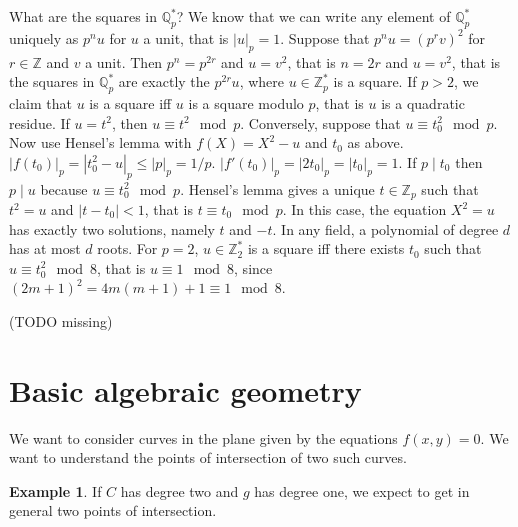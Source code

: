 \documentclass{article}
\newcommand{\Z}{\mathbb{Z}}
\newcommand{\Q}{\mathbb{Q}}
\newcommand{\rb}[1]{\left( #1 \right)}
\newcommand{\abs}[1]{\left\lvert #1 \right\rvert}
\theoremstyle{definition}\newtheorem{definition}{Definition}[section]
\theoremstyle{definition}\newtheorem{remark}[definition]{Remark}
\theoremstyle{definition}\newtheorem*{example}{Example}
\theoremstyle{definition}\newtheorem*{note}{Note}
\begin{document}

What are the squares in $ \Q_p^* $? We know that we can write any element of $ \Q_p^* $ uniquely as $ p^nu $ for $ u $ a unit, that is $ \abs{u}_p = 1 $. Suppose that $ p^nu = \rb{p^rv}^2 $ for $ r \in \Z $ and $ v $ a unit. Then $ p^n = p^{2r} $ and $ u = v^2 $, that is $ n = 2r $ and $ u = v^2 $, that is the squares in $ \Q_p^* $ are exactly the $ p^{2r}u $, where $ u \in \Z_p^* $ is a square. If $ p > 2 $, we claim that $ u $ is a square iff $ u $ is a square modulo $ p $, that is $ u $ is a quadratic residue. If $ u = t^2 $, then $ u \equiv t^2 \mod p $. Conversely, suppose that $ u \equiv t_0^2 \mod p $. Now use Hensel's lemma with $ f\rb{X} = X^2 - u $ and $ t_0 $ as above. $ \abs{f\rb{t_0}}_p = \abs{t_0^2 - u}_p \le \abs{p}_p = 1 / p $. $ \abs{f'\rb{t_0}}_p = \abs{2t_0}_p = \abs{t_0}_p = 1 $. If $ p \mid t_0 $ then $ p \mid u $ because $ u \equiv t_0^2 \mod p $. Hensel's lemma gives a unique $ t \in \Z_p $ such that $ t^2 = u $ and $ \abs{t - t_0} < 1 $, that is $ t \equiv t_0 \mod p $. In this case, the equation $ X^2 = u $ has exactly two solutions, namely $ t $ and $ -t $. In any field, a polynomial of degree $ d $ has at most $ d $ roots. For $ p = 2 $, $ u \in \Z_2^* $ is a square iff there exists $ t_0 $ such that $ u \equiv t_0^2 \mod 8 $, that is $ u \equiv 1 \mod 8 $, since $ \rb{2m + 1}^2 = 4m\rb{m + 1} + 1 \equiv 1 \mod 8 $.

(TODO missing)

\section{Basic algebraic geometry}

We want to consider curves in the plane given by the equations $ f\rb{x, y} = 0 $. We want to understand the points of intersection of two such curves.

\begin{example}
If $ C $ has degree two and $ g $ has degree one, we expect to get in general two points of intersection.
\end{example}
\end{document}
